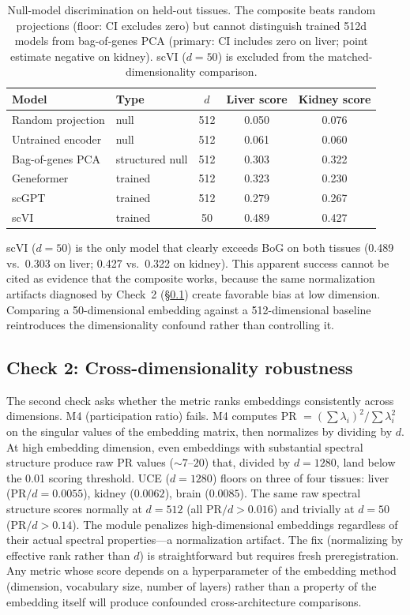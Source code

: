 \documentclass[10pt,letterpaper]{article}
\begin{document}
\begin{table}[t]
\centering
\caption{Null-model discrimination on held-out tissues. The composite beats random projections (floor: CI excludes zero) but cannot distinguish trained 512d models from bag-of-genes PCA (primary: CI includes zero on liver; point estimate negative on kidney). scVI ($d = 50$) is excluded from the matched-dimensionality comparison.}
\label{tab:v6b}
\small
\begin{tabular}{@{}llccc@{}}
\toprule
Model & Type & $d$ & Liver score & Kidney score \\
\midrule
Random projection & null & 512 & 0.050 & 0.076 \\
Untrained encoder & null & 512 & 0.061 & 0.060 \\
\midrule
Bag-of-genes PCA & structured null & 512 & 0.303 & 0.322 \\
\midrule
Geneformer & trained & 512 & 0.323 & 0.230 \\
scGPT & trained & 512 & 0.279 & 0.267 \\
scVI & trained & 50 & 0.489 & 0.427 \\
\bottomrule
\end{tabular}
\end{table}

scVI ($d = 50$) is the only model that clearly exceeds BoG on both tissues (0.489 vs.\ 0.303 on liver; 0.427 vs.\ 0.322 on kidney). This apparent success cannot be cited as evidence that the composite works, because the same normalization artifacts diagnosed by Check~2 (\S\ref{sec:check2}) create favorable bias at low dimension. Comparing a 50-dimensional embedding against a 512-dimensional baseline reintroduces the dimensionality confound rather than controlling it.

\subsection{Check 2: Cross-dimensionality robustness}
\label{sec:check2}

The second check asks whether the metric ranks embeddings consistently across dimensions. M4 (participation ratio) fails. M4 computes PR $= (\sum \lambda_i)^2 / \sum \lambda_i^2$ on the singular values of the embedding matrix, then normalizes by dividing by $d$. At high embedding dimension, even embeddings with substantial spectral structure produce raw PR values ($\sim 7$--$20$) that, divided by $d = 1280$, land below the 0.01 scoring threshold. UCE ($d = 1280$) floors on three of four tissues: liver (PR$/d = 0.0055$), kidney ($0.0062$), brain ($0.0085$). The same raw spectral structure scores normally at $d = 512$ (all PR$/d > 0.016$) and trivially at $d = 50$ (PR$/d > 0.14$). The module penalizes high-dimensional embeddings regardless of their actual spectral properties---a normalization artifact. The fix (normalizing by effective rank rather than $d$) is straightforward but requires fresh preregistration. Any metric whose score depends on a hyperparameter of the embedding method (dimension, vocabulary size, number of layers) rather than a property of the embedding itself will produce confounded cross-architecture comparisons.
\end{document}
